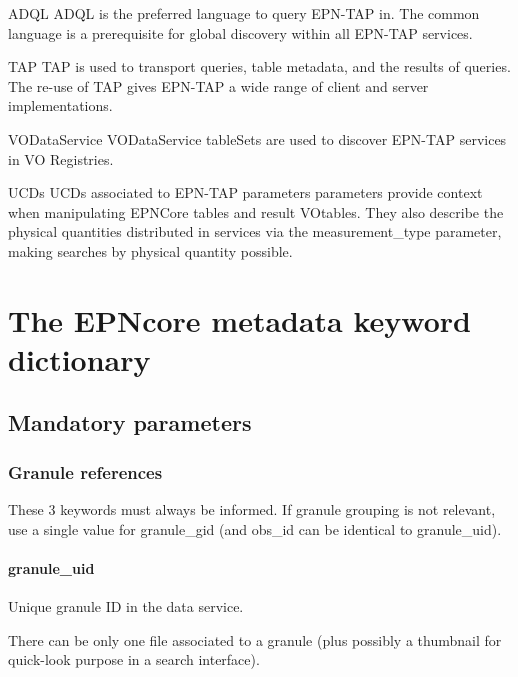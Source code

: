 \documentclass[11pt,a4paper]{ivoa}
\begin{document}
\begin{bigdescription}
\item[ADQL \citep{2008ivoa.spec.1030O}] ADQL is the preferred language to
query EPN-TAP in.  The common language is a prerequisite for global
discovery within all EPN-TAP services.
\item[TAP \citep{2010ivoa.spec.0327D}] TAP is used to transport queries,
table metadata, and the results of queries.  The re-use of TAP gives
EPN-TAP a wide range of client and server implementations.
\item[VODataService \citep{2010ivoa.spec.1202P}] VODataService tableSets are used to
discover EPN-TAP services in VO Registries.
\item[UCDs \citep{2018ivoa.spec.0527M}] UCDs associated to EPN-TAP parameters parameters provide context when manipulating EPNCore tables and result VOtables. They also describe the physical quantities distributed in services via the measurement\_type parameter, making searches by physical quantity possible.
\end{bigdescription}

\section{The EPNcore metadata keyword dictionary} 

\subsection{Mandatory parameters}

\subsubsection{Granule references}

These 3 keywords must always be informed. If granule grouping is not relevant, use a single value for granule\_gid (and obs\_id can be identical to granule\_uid).

\paragraph{granule\_uid}

Unique granule ID in the data service.

There can be only one file associated to a granule (plus possibly a thumbnail for quick-look purpose in a search interface).
\end{document}
